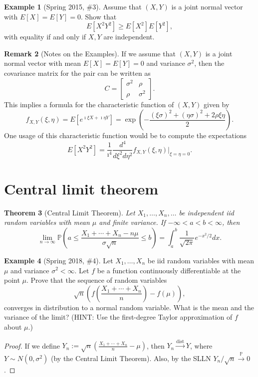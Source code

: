 \documentclass[12pt,reqno]{article}
\theoremstyle{plain}
\newtheorem{theorem}{Theorem}[section]
\theoremstyle{definition}
\newtheorem{example}[theorem]{Example}
\newtheorem{remark}[theorem]{Remark}
\begin{document}
\begin{example}[Spring 2015, \#3]
Assume that $(X, Y)$ is a joint normal vector with $E[X] = E[Y] = 0$. 
Show that 
\[
E[X^2Y^2] \geq E[X^2]E[Y^2], 
\]
with equality if and only if $X,Y$ are independent. 
\end{example}

\begin{remark}[Notes on the Examples] 
If we assume that $(X, Y)$ is a joint normal vector with mean $E[X]=E[Y]=0$ 
and variance $\sigma^2$, then the covariance matrix for the pair can be 
written as 
\[
C = \begin{bmatrix} \sigma^2 & \rho \\ \rho & \sigma^2 \end{bmatrix}. 
\]
This implies a formula for the characteristic function of $(X,Y)$ given by 
\[
f_{X,Y}(\xi,\eta) = E[e^{\imath \xi X + \imath \eta Y}] = 
     \exp\left(-\frac{(\xi \sigma)^2 + (\eta \sigma)^2 + 2 \rho\xi\eta}{2} 
     \right). 
\]
One usage of this characteristic function would be to compute the 
expectations 
\[
E[X^2Y^2] = \frac{1}{\imath^4} \frac{d^4}{d\xi^2 d\eta^2} f_{X,Y}(\xi,\eta) 
     \Biggr\rvert_{\xi=\eta=0}. 
\]
\end{remark} 

\newpage 
\section{Central limit theorem} 

\begin{theorem}[Central Limit Theorem]
Let $X_1,\ldots,X_n,\ldots$ be independent iid random variables with 
mean $\mu$ and finite variance. If $-\infty < a < b < \infty$, then 
\[
\lim_{n \rightarrow \infty} \mathbb{P}\left( 
     a \leq \frac{X_1+\cdots+X_n - n\mu}{\sigma\sqrt{n}} \leq b\right) = 
     \int_a^b \frac{1}{\sqrt{2\pi}} e^{-x^2 / 2} dx. 
\]
\end{theorem} 

\begin{example}[Spring 2018, \#4]
Let $X_1,\ldots,X_n$ be iid random variables with mean $\mu$ and 
variance $\sigma^2 < \infty$. Let $f$ be a function continuously 
differentiable at the point $\mu$. Prove that the sequence of random 
variables 
\[
\sqrt{n}\left(f\left(\frac{X_1+\cdots+X_n}{n}\right) - f(\mu)\right), 
\]
converges in distribution to a normal random variable. What is the 
mean and the variance of the limit? 
(HINT: Use the first-degree Taylor approximation of $f$ about $\mu$.)
\end{example} 
\begin{proof}
If we define $Y_n := \sqrt{n}\left(\frac{X_1+\cdots+X_n}{n} - \mu\right)$, 
then $Y_n \xrightarrow{\operatorname{dist}} Y$, where 
$Y \sim N(0, \sigma^2)$ (by the Central Limit Theorem). 
Also, by the SLLN $Y_n / \sqrt{n} \xrightarrow{\mathbb{P}} 0$. 
\end{proof} 
\end{document}
